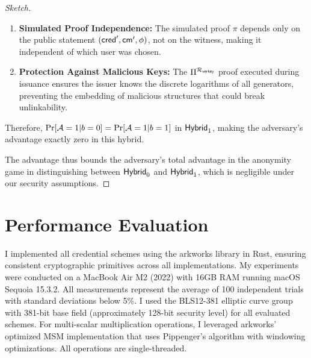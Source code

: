 \begin{proof}[Sketch]
\begin{enumerate}
    \item \textbf{Simulated Proof Independence:} The simulated proof $\pi$ depends only on the public statement $(\mathsf{cred}', \mathsf{cm}', \phi)$, not on the witness, making it independent of which user was chosen.
    
    \item \textbf{Protection Against Malicious Keys:} The $\Pi^{\mathcal{R}_{\mathsf{verkey}}}$ proof executed during issuance ensures the issuer knows the discrete logarithms of all generators, preventing the embedding of malicious structures that could break unlinkability.
\end{enumerate}

Therefore, $\Pr[\mathcal{A} = 1 | b = 0] = \Pr[\mathcal{A} = 1 | b = 1]$ in $\mathsf{Hybrid}_1$, making the adversary's advantage exactly zero in this hybrid.

The advantage thus bounds the adversary's total advantage in the anonymity game in distinguishing between $\mathsf{Hybrid}_0$ and $\mathsf{Hybrid}_1$, which is negligible under our security assumptions.
\end{proof}






































\section{Performance Evaluation}\label{sec:performance_evaluation}


I implemented all credential schemes using the arkworks library \cite{arkworks_contributors_arkworks_2022} in Rust, ensuring consistent cryptographic primitives across all implementations. My experiments were conducted on a MacBook Air M2 (2022) with 16GB RAM running macOS Sequoia 15.3.2. All measurements represent the average of 100 independent trials with standard deviations below 5\%. I used the BLS12-381 elliptic curve group with 381-bit base field (approximately 128-bit security level) for all evaluated schemes. For multi-scalar multiplication operations, I leveraged arkworks' optimized MSM implementation that uses Pippenger's algorithm with windowing optimizations. All operations are single-threaded. 


